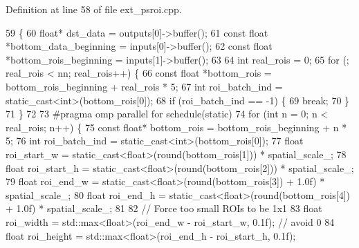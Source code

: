 Definition at line 58 of file ext\+\_\+psroi.\+cpp.


\begin{DoxyCode}
59                                                              \{
60         \textcolor{keywordtype}{float}* dst\_data = outputs[0]->buffer();
61         \textcolor{keyword}{const} \textcolor{keywordtype}{float} *bottom\_data\_beginning = inputs[0]->buffer();
62         \textcolor{keyword}{const} \textcolor{keywordtype}{float} *bottom\_rois\_beginning = inputs[1]->buffer();
63 
64         \textcolor{keywordtype}{int} real\_rois = 0;
65         \textcolor{keywordflow}{for} (; real\_rois < nn; real\_rois++) \{
66             \textcolor{keyword}{const} \textcolor{keywordtype}{float} *bottom\_rois = bottom\_rois\_beginning + real\_rois * 5;
67             \textcolor{keywordtype}{int} roi\_batch\_ind = \textcolor{keyword}{static\_cast<}\textcolor{keywordtype}{int}\textcolor{keyword}{>}(bottom\_rois[0]);
68             \textcolor{keywordflow}{if} (roi\_batch\_ind == -1) \{
69                 \textcolor{keywordflow}{break};
70             \}
71         \}
72 
73 \textcolor{preprocessor}{        #pragma omp parallel for schedule(static)}
74         \textcolor{keywordflow}{for} (\textcolor{keywordtype}{int} n = 0; n < real\_rois; n++) \{
75             \textcolor{keyword}{const} \textcolor{keywordtype}{float}* bottom\_rois = bottom\_rois\_beginning + n * 5;
76             \textcolor{keywordtype}{int} roi\_batch\_ind = \textcolor{keyword}{static\_cast<}\textcolor{keywordtype}{int}\textcolor{keyword}{>}(bottom\_rois[0]);
77             \textcolor{keywordtype}{float} roi\_start\_w = \textcolor{keyword}{static\_cast<}\textcolor{keywordtype}{float}\textcolor{keyword}{>}(round(bottom\_rois[1])) * spatial\_scale\_;
78             \textcolor{keywordtype}{float} roi\_start\_h = \textcolor{keyword}{static\_cast<}\textcolor{keywordtype}{float}\textcolor{keyword}{>}(round(bottom\_rois[2])) * spatial\_scale\_;
79             \textcolor{keywordtype}{float} roi\_end\_w   = \textcolor{keyword}{static\_cast<}\textcolor{keywordtype}{float}\textcolor{keyword}{>}(round(bottom\_rois[3]) + 1.0f) * spatial\_scale\_;
80             \textcolor{keywordtype}{float} roi\_end\_h   = \textcolor{keyword}{static\_cast<}\textcolor{keywordtype}{float}\textcolor{keyword}{>}(round(bottom\_rois[4]) + 1.0f) * spatial\_scale\_;
81 
82             \textcolor{comment}{// Force too small ROIs to be 1x1}
83             \textcolor{keywordtype}{float} roi\_width  = std::max<float>(roi\_end\_w - roi\_start\_w, 0.1f);  \textcolor{comment}{// avoid 0}
84             \textcolor{keywordtype}{float} roi\_height = std::max<float>(roi\_end\_h - roi\_start\_h, 0.1f);

\end{DoxyCode}

